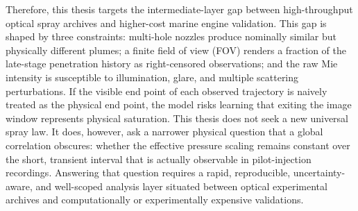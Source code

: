 Therefore, this thesis targets the intermediate-layer gap between high-throughput optical spray archives and higher-cost marine engine validation.
This gap is shaped by three constraints: multi-hole nozzles produce nominally similar but physically different plumes; a finite field of view (FOV) renders a fraction of the late-stage penetration history as right-censored observations; and the raw Mie intensity is susceptible to illumination, glare, and multiple scattering perturbations.
If the visible end point of each observed trajectory is naively treated as the physical end point, the model risks learning that exiting the image window represents physical saturation.
This thesis does not seek a new universal spray law. It does, however, ask a narrower physical question that a global correlation obscures: whether the effective pressure scaling remains constant over the short, transient interval that is actually observable in pilot-injection recordings. Answering that question requires a rapid, reproducible, uncertainty-aware, and well-scoped analysis layer situated between optical experimental archives and computationally or experimentally expensive validations.

